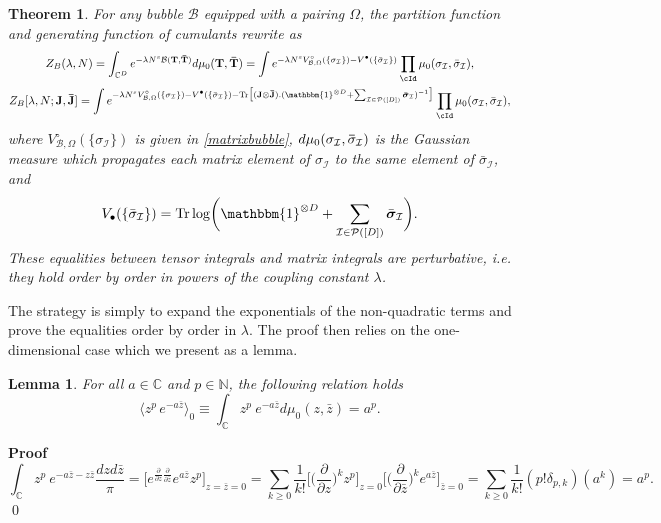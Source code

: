 \documentclass[aps,prd,10pt,notitlepage,nofootinbib,superscriptaddress,showkeys,showpacs]{revtex4-1}
\newtheorem{lemma}{Lemma}
\newtheorem{theorem}{Theorem}
\begin{document}
\begin{theorem}
\label{thm:intmat1}
For any bubble ${\mathcal{B}}$ equipped with a pairing $\Omega$, the partition function and generating function of cumulants rewrite as
\begin{gather} \label{TensorMatrixEquality}
 Z_{B}(\lambda, N)
=\int_{{\mathbb{C}}^D}e^{-{\lambda}{N^s} {\mathcal{B}}({\bf T}, {\bf \bar{T}})}d\mu_{0}({\bf T}, {\bf \bar{T}})
=\int e^{ - {\lambda}{N^s} V_{{\mathcal{B}},\Omega}^{\circ}(\{\sigma_{\mathcal{I}}\})-V^{\bullet}(\{\bar{\sigma}_{\mathcal{I}}\})  }\prod_\cId\mu_{0}(\sigma_{\mathcal{I}},\bar{\sigma}_{\mathcal{I}}),
\\
\label{eqref:genfunc}
 Z_{B}[\lambda, N;{\bf J, \bar J}]
=\int e^{ - {\lambda}{N^s} V_{{\mathcal{B}},\Omega}^{\circ}(\{\sigma_{\mathcal{I}}\})-V^{\bullet}(\{\bar{\sigma}_{\mathcal{I}}\})-\operatorname{Tr} \bigl[({\bf J}\otimes{\bf \bar{J}}).({\mathbbm{1}}^{\otimes D}+\sum_{{\mathcal{I}}\in{\mathcal{P}}([D])} \bar {\bm{\sigma}}_{\mathcal{I}})^{-1} \bigl] }\prod_\cId\mu_{0}(\sigma_{\mathcal{I}},\bar{\sigma}_{\mathcal{I}}),
\end{gather}
where $V_{{\mathcal{B}},\Omega}^{\circ}(\{\sigma_{\mathcal{I}}\})$ is given in \eqref{matrixbubble}, $d\mu_{0}(\sigma_{\mathcal{I}},{\bf  \bar \sigma_{\mathcal{I}}})$ is the Gaussian measure which propagates each matrix element of $\sigma_{\mathcal{I}}$ to the same element of $\bar{\sigma}_{\mathcal{I}}$, and
\begin{equation}
\label{BlackVert}
V_{\bullet}(\{\bar{\sigma}_{\mathcal{I}}\}) =\operatorname{Tr}\log\biggl({\mathbbm{1}}^{\otimes D}+\sum_{{\mathcal{I}}\in{\mathcal{P}}([D])}
\bar {\bm{\sigma}}_{\mathcal{I}}\biggr).
\end{equation}
These equalities between tensor integrals and matrix integrals are \emph{perturbative}, i.e. they hold order by order in powers of the coupling constant $\lambda$.
\end{theorem}

The strategy is simply to expand the exponentials of the non-quadratic terms and prove the equalities order by order in $\lambda$. The proof then relies on the one-dimensional case which we present as a lemma.
\begin{lemma} 
For all $a\in{\mathbb{C}}$ and $p\in{\mathbb{N}}$, the following relation holds
\begin{equation}
\label{eqref:relationprf}
\langle z^p\,e^{-a\bar{z}}\rangle_0 \equiv \int_{\mathbb C} z^p \ e^{-  a \bar z }d\mu_{0}(z, \bar z) = a^p.
\end{equation}
\end{lemma}
{{\noindent \bf Proof\; \; }} 
\begin{equation} 
\int_{\mathbb{C}} z^p \ e^{-  a\bar z -z\bar z}\frac{dz d\bar z}{\pi}
=\biggl[ e^{\frac{\partial}{\partial z}\frac{\partial}{\partial \bar z}} e^{a\bar z}z^p\biggr]_{z=\bar z=0}
=\sum_{k\ge0}\frac{1}{k!}\bigl[ \bigl(\frac{\partial}{\partial z}\bigr)^k z^p\bigr]_{z=0}\bigl[ \bigl(\frac{\partial}{\partial \bar z}\bigr)^k e^{a\bar z}\bigr]_{\bar z=0}
=\sum_{k\ge0}\frac{1}{k!}(p!\delta_{p,k})(a^k)=a^p . 
\end{equation}
\qed
\end{document}
